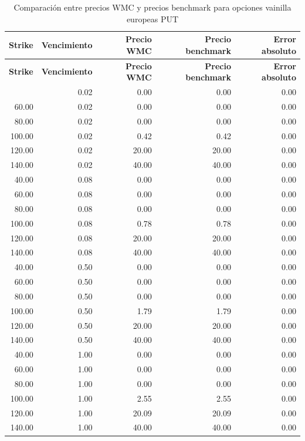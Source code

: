 \clearpage
\begingroup
\scriptsize
\renewcommand{\arraystretch}{0.82}
\setlength{\tabcolsep}{4pt}
\begin{longtable}{@{}rrrrr@{}}
\caption{Comparación entre precios WMC y precios benchmark para opciones vainilla europeas PUT}\label{tab:wmc_vs_ref_put}\\
\toprule
\textbf{Strike} & \textbf{Vencimiento} & \textbf{Precio WMC} & \textbf{Precio benchmark} & \textbf{Error absoluto} \\
\midrule
\endfirsthead
\toprule
\textbf{Strike} & \textbf{Vencimiento} & \textbf{Precio WMC} & \textbf{Precio benchmark} & \textbf{Error absoluto} \\
\midrule
\endhead
\bottomrule
\endlastfoot
40.00  & 0.02  & 0.00 & 0.00 & 0.00 \\
60.00  & 0.02  & 0.00 & 0.00 & 0.00 \\
80.00  & 0.02  & 0.00 & 0.00 & 0.00 \\
100.00 & 0.02  & 0.42 & 0.42 & 0.00 \\
120.00 & 0.02  & 20.00 & 20.00 & 0.00 \\
140.00 & 0.02  & 40.00 & 40.00 & 0.00 \\
40.00  & 0.08  & 0.00 & 0.00 & 0.00 \\
60.00  & 0.08  & 0.00 & 0.00 & 0.00 \\
80.00  & 0.08  & 0.00 & 0.00 & 0.00 \\
100.00 & 0.08  & 0.78 & 0.78 & 0.00 \\
120.00 & 0.08  & 20.00 & 20.00 & 0.00 \\
140.00 & 0.08  & 40.00 & 40.00 & 0.00 \\
40.00  & 0.50  & 0.00 & 0.00 & 0.00 \\
60.00  & 0.50  & 0.00 & 0.00 & 0.00 \\
80.00  & 0.50  & 0.00 & 0.00 & 0.00 \\
100.00 & 0.50  & 1.79 & 1.79 & 0.00 \\
120.00 & 0.50  & 20.00 & 20.00 & 0.00 \\
140.00 & 0.50  & 40.00 & 40.00 & 0.00 \\
40.00  & 1.00  & 0.00 & 0.00 & 0.00 \\
60.00  & 1.00  & 0.00 & 0.00 & 0.00 \\
80.00  & 1.00  & 0.00 & 0.00 & 0.00 \\
100.00 & 1.00  & 2.55 & 2.55 & 0.00 \\
120.00 & 1.00  & 20.09 & 20.09 & 0.00 \\
140.00 & 1.00  & 40.00 & 40.00 & 0.00 \\

\end{longtable}
